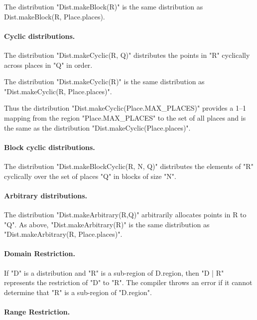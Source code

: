 The distribution \xcd"Dist.makeBlock(R)" is the same distribution as {\cf
Dist.makeBlock(R, Place.places)}.

\paragraph{Cyclic distributions.} 
The distribution \xcd"Dist.makeCyclic(R, Q)" distributes the points in \xcd"R"
cyclically across places in \xcd"Q" in order.

The distribution \xcd"Dist.makeCyclic(R)" is the same distribution as
\xcd"Dist.makeCyclic(R, Place.places)". 

Thus the distribution \xcd"Dist.makeCyclic(Place.MAX_PLACES)" provides a 1--1
mapping from the region \xcd"Place.MAX_PLACES" to the set of all
places and is the same as the distribution \xcd"Dist.makeCyclic(Place.places)".

\paragraph{Block cyclic distributions.}
The distribution \xcd"Dist.makeBlockCyclic(R, N, Q)" distributes the elements
of \xcd"R" cyclically over the set of places \xcd"Q" in blocks of size
\xcd"N".

\paragraph{Arbitrary distributions.} 
The distribution \xcd"Dist.makeArbitrary(R,Q)" arbitrarily allocates points in {\cf
R} to \xcd"Q". As above, \xcd"Dist.makeArbitrary(R)" is the same distribution as
\xcd"Dist.makeArbitrary(R, Place.places)".


\paragraph{Domain Restriction.} 

If \xcd"D" is a distribution and \xcd"R" is a sub-region of {\cf
D.region}, then \xcd"D | R" represents the restriction of \xcd"D" to
\xcd"R".  The compiler throws an error if it cannot determine that
\xcd"R" is a sub-region of \xcd"D.region".

\paragraph{Range Restriction.}

